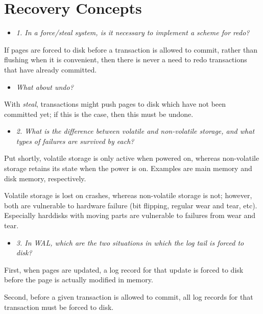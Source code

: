 \newpage
\section{Recovery Concepts}

\begin{itemize}
  \item \textit{1. In a force/steal system, is it necessary to implement
    a scheme for redo?}
\end{itemize}

If pages are forced to disk before a transaction is allowed to commit, rather
than flushing when it is convenient, then there is never a need to redo
transactions that have already committed.


\begin{itemize}
  \item \textit{What about undo?}
\end{itemize}

With \textit{steal}, transactions might push pages to disk which have not been
committed yet; if this is the case, then this must be undone.

\streg

\begin{itemize}
  \item \textit{2. What is the difference between volatile and non-volatile
    storage, and what types of failures are survived by each?}
\end{itemize}

Put shortly, volatile storage is only active when powered on, whereas
non-volatile storage retains its state when the power is on. Examples are main
memory and disk memory, respectively. \medskip

Volatile storage is lost on crashes, whereas non-volatile storage is not;
however, both are vulnerable to hardware failure (bit flipping, regular wear and
tear, etc). Especially harddisks with moving parts are vulnerable to failures
from wear and tear.

\streg

\begin{itemize}
  \item \textit{3. In WAL, which are the two situations in which the log tail is
    forced to disk?}
\end{itemize}

First, when pages are updated, a log record for that update is forced to disk before
the page is actually modified in memory.\smallskip

Second, before a given transaction is allowed to commit, all log records for
that transaction must be forced to disk.


